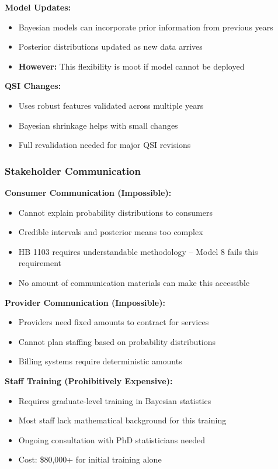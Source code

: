 \textbf{Model Updates:}
\begin{itemize}
    \item Bayesian models can incorporate prior information from previous years
    \item Posterior distributions updated as new data arrives
    \item \textbf{However:} This flexibility is moot if model cannot be deployed
\end{itemize}

\textbf{QSI Changes:}
\begin{itemize}
    \item Uses robust features validated across multiple years
    \item Bayesian shrinkage helps with small changes
    \item Full revalidation needed for major QSI revisions
\end{itemize}

\subsubsection{Stakeholder Communication}

\textbf{Consumer Communication (Impossible):}
\begin{itemize}
    \item Cannot explain probability distributions to consumers
    \item Credible intervals and posterior means too complex
    \item HB 1103 requires understandable methodology -- Model 8 fails this requirement
    \item No amount of communication materials can make this accessible
\end{itemize}

\textbf{Provider Communication (Impossible):}
\begin{itemize}
    \item Providers need fixed amounts to contract for services
    \item Cannot plan staffing based on probability distributions
    \item Billing systems require deterministic amounts
\end{itemize}

\textbf{Staff Training (Prohibitively Expensive):}
\begin{itemize}
    \item Requires graduate-level training in Bayesian statistics
    \item Most staff lack mathematical background for this training
    \item Ongoing consultation with PhD statisticians needed
    \item Cost: \$80,000+ for initial training alone
\end{itemize}

